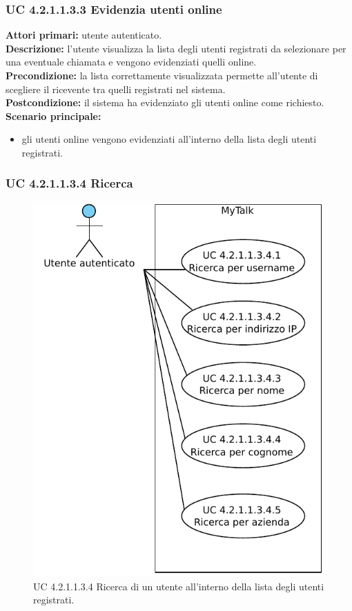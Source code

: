 \subsubsection{UC 4.2.1.1.3.3 Evidenzia utenti online}
\noindent
\textbf{Attori primari:} utente autenticato.\\
\textbf{Descrizione:} l'utente visualizza la lista degli utenti registrati da selezionare per una eventuale chiamata e vengono evidenziati quelli online.\\
\textbf{Precondizione:} la lista correttamente visualizzata permette all'utente di scegliere il ricevente tra quelli registrati nel sistema.\\
\textbf{Postcondizione:} il sistema ha evidenziato gli utenti online come richiesto.\\
\textbf{Scenario principale:}
\begin{itemize}
\item gli utenti online vengono evidenziati all'interno della lista degli utenti registrati.
\end{itemize}

\newpage

\subsubsection{UC 4.2.1.1.3.4 Ricerca}

\begin{figure}[htbp]
\centering
\includegraphics[scale=0.7]{./casi_uso/UC4-2-1-1-3-4.pdf}
\caption{UC 4.2.1.1.3.4 Ricerca di un utente all'interno della lista degli utenti registrati.}
\end{figure}

